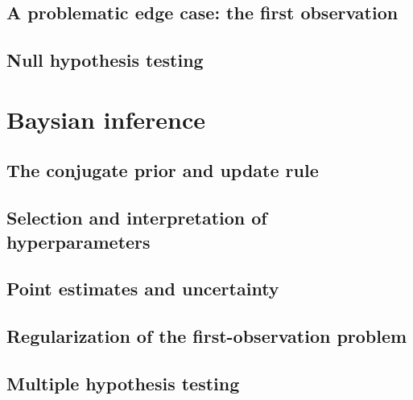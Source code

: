 \documentclass[12pt, letterpaper]{article}
\begin{document}
\subsection{A problematic edge case: the first observation}

\subsection{Null hypothesis testing}


\section{Baysian inference}

\subsection{The conjugate prior and update rule}

\subsection{Selection and interpretation of hyperparameters}

\subsection{Point estimates and uncertainty}

\subsection{Regularization of the first-observation problem}

\subsection{Multiple hypothesis testing}
\end{document}
